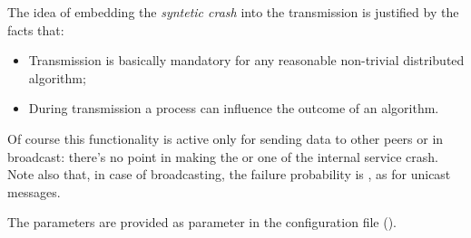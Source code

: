 The idea of embedding the \emph{syntetic crash} into the transmission is
justified by the facts that:
\begin{itemize}

\item   Transmission is basically mandatory for any reasonable non-trivial
        distributed algorithm;

\item   During transmission a process can influence the outcome of an
        algorithm.

\end{itemize}

Of course this functionality is active only for  sending
data to other peers or in broadcast: there's no point in making the
 or one of the internal service crash. Note also that,
in case of broadcasting, the failure probability is \PCrash, as for
unicast messages.

The parameters are provided as parameter in the configuration file
().

